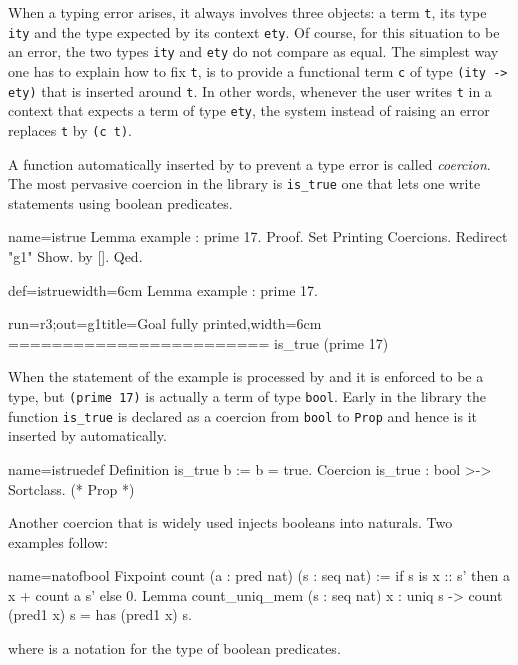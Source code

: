 When a typing error arises, it always involves three objects:
a term \lstinline/t/, its type \lstinline/ity/ and the type
expected by its context \lstinline/ety/.  Of course, for this
situation to be an error, the two types \lstinline/ity/ and
\lstinline/ety/ do not compare as equal.
The simplest way one has to explain \Coq{} how to fix \lstinline/t/,
is to provide a functional term \lstinline/c/ of type
\lstinline/(ity -> ety)/ that is inserted around \lstinline/t/.
In other words, whenever the user writes \lstinline/t/ in a context
that expects a term of type \lstinline/ety/, the system instead of
raising an error replaces \lstinline/t/ by \lstinline/(c t)/.

A function automatically inserted by \Coq{} to prevent a type
error is called \emph{coercion}.
The most pervasive coercion in the \mcbMC{} library is
\lstinline/is_true/ one that lets one write statements using boolean
predicates.

\begin{coqdef}{name=istrue}
Lemma example : prime 17.
Proof.
Set Printing Coercions. Redirect "g1" Show.
by [].
Qed.
\end{coqdef}
\begin{coq}{def=istrue}{width=6cm}
Lemma example : prime 17.
$~$
$~$
\end{coq}
\begin{coqout}{run=r3;out=g1}{title=Goal fully printed,width=6cm}
========================
is_true (prime 17)
\end{coqout}

When the statement of the example is processed by \Coq{}
and it is enforced to be a type, but \lstinline/(prime 17)/ is actually
a term of type \lstinline/bool/.  Early in the library the
function \lstinline/is_true/ is declared as a coercion from
\lstinline/bool/ to \lstinline/Prop/ and hence is it inserted
by \Coq{} automatically.

\begin{coq}{name=istruedef}{}
Definition is_true b := b = true.
Coercion is_true : bool >-> Sortclass. (* Prop *)
\end{coq}

Another coercion that is widely used injects booleans into naturals.
Two examples follow:

\begin{coq}{name=natofbool}{}
Fixpoint count (a : pred nat) (s : seq nat) :=
  if s is x :: s' then a x + count a s' else 0.
Lemma count_uniq_mem (s : seq nat) x :
  uniq s -> count (pred1 x) s = has (pred1 x) s.
\end{coq}
where  is a notation for the type   of boolean
predicates.


